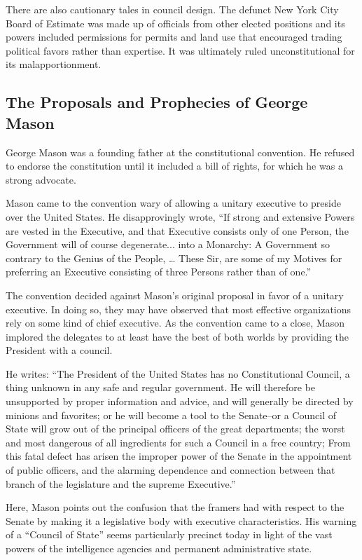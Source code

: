 \documentclass{article}
\newcommand{\quotes}[1]{``#1''}
\begin{document}
There are also cautionary tales in council design. The defunct New York City Board of Estimate was made up of officials from other elected positions and its powers included permissions for permits and land use that encouraged trading political favors rather than expertise\cite{Purnick}. It was ultimately ruled unconstitutional for its malapportionment\cite{Board_of_Estimate}.

\subsection{The Proposals and Prophecies of George Mason}

George Mason was a founding father at the constitutional convention. He refused to endorse the constitution until it included a bill of rights, for which he was a strong advocate.

Mason came to the convention wary of allowing a unitary executive to preside over the United States. He disapprovingly wrote, \quotes{If strong and extensive Powers are vested in the Executive, and that Executive consists only of one Person, the Government will of course degenerate... into a Monarchy: A Government so contrary to the Genius of the People, … These Sir, are some of my Motives for preferring an Executive consisting of three Persons rather than of one.}\cite{Mason}

The convention decided against Mason's original proposal in favor of a unitary executive. In doing so, they may have observed that most effective organizations rely on some kind of chief executive. As the convention came to a close, Mason implored the delegates to at least have the best of both worlds by providing the President with a council.

He writes: \quotes{The President of the United States has no Constitutional Council, a thing unknown in any safe and regular government. He will therefore be unsupported by proper information and advice, and will generally be directed by minions and favorites; or he will become a tool to the Senate--or a Council of State will grow out of the principal officers of the great departments; the worst and most dangerous of all ingredients for such a Council in a free country; From this fatal defect has arisen the improper power of the Senate in the appointment of public officers, and the alarming dependence and connection between that branch of the legislature and the supreme Executive.}\cite{Mason_Objection}

Here, Mason points out the confusion that the framers had with respect to the Senate by making it a legislative body with executive characteristics. His warning of a \quotes{Council of State} seems particularly precinct today in light of the vast powers of the intelligence agencies and permanent administrative state.\cite{Cooper}
\end{document}
